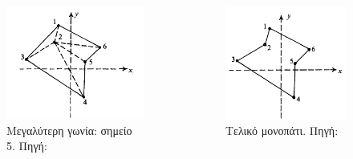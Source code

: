 \documentclass[xcolor=dvipsnames, 11pt]{beamer}
\begin{document}
\begin{frame}
\begin{columns}
\begin{column}{0.3\textwidth}
			\begin{figure}
				\includegraphics[scale=0.12]{images/geometric_approach_angle3.png}
				\caption{Μεγαλύτερη γωνία: σημείο 5. Πηγή: \cite{16}}
			\end{figure} 
		\end{column}
		\begin{column}{0.3\textwidth}
			\begin{figure}
				\includegraphics[scale=0.12]{images/geometric_approach_angle4.png}
				\caption{Τελικό μονοπάτι. Πηγή: 	\cite{16}}
			\end{figure} 
		\end{column}	
	\end{columns}
\end{frame}
\end{document}
